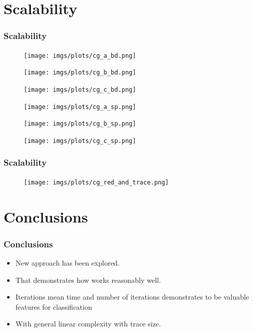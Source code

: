 \documentclass{beamer}
\begin{document}
\section{Scalability}
\begin{frame}
	\frametitle{Scalability}
	\begin{multicols}{2}
	\begin{figure}
		\texttt{[image: imgs/plots/cg\_a\_bd.png]}
	\end{figure}
	\begin{figure}
		\texttt{[image: imgs/plots/cg\_b\_bd.png]}
	\end{figure}
	\begin{figure}
		\texttt{[image: imgs/plots/cg\_c\_bd.png]}
	\end{figure}
	\columnbreak
	\begin{figure}
		\texttt{[image: imgs/plots/cg\_a\_sp.png]}
	\end{figure}
	\begin{figure}
		\texttt{[image: imgs/plots/cg\_b\_sp.png]}
	\end{figure}
	\begin{figure}
		\texttt{[image: imgs/plots/cg\_c\_sp.png]}
	\end{figure}
	\end{multicols}
\end{frame}

\begin{frame}
	\frametitle{Scalability}
	
	\begin{figure}
		\texttt{[image: imgs/plots/cg\_red\_and\_trace.png]}
	\end{figure}
\end{frame}

\section{Conclusions}
\begin{frame}
\frametitle{Conclusions}
\begin{itemize}[<+->]
	\item New approach has been explored.
	\item That demonstrates how works reasonably well.
	\item Iterations mean time and number of iterations demonstrates to be valuable features for classification
	\item With general linear complexity with trace size.
\end{itemize}
\end{frame}
\end{document}
